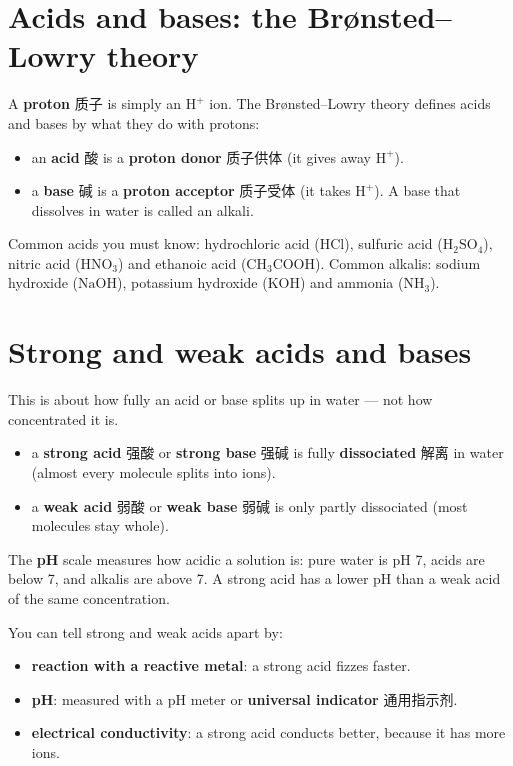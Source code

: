 \documentclass[11pt]{article}
\begin{document}
\section*{Acids and bases: the Brønsted–Lowry theory}

A \textbf{proton} 质子 is simply an $\text{H}^+$ ion. The Brønsted–Lowry theory defines acids and bases by what they do with protons:

\begin{itemize}
\item an \textbf{acid} 酸 is a \textbf{proton donor} 质子供体 (it gives away $\text{H}^+$).

\item a \textbf{base} 碱 is a \textbf{proton acceptor} 质子受体 (it takes $\text{H}^+$). A base that dissolves in water is called an alkali.

\end{itemize}

Common acids you must know: hydrochloric acid ($\text{HCl}$), sulfuric acid ($\text{H}_2\text{SO}_4$), nitric acid ($\text{HNO}_3$) and ethanoic acid ($\text{CH}_3\text{COOH}$). Common alkalis: sodium hydroxide ($\text{NaOH}$), potassium hydroxide ($\text{KOH}$) and ammonia ($\text{NH}_3$).

\section*{Strong and weak acids and bases}

This is about how fully an acid or base splits up in water — not how concentrated it is.

\begin{itemize}
\item a \textbf{strong acid} 强酸 or \textbf{strong base} 强碱 is fully \textbf{dissociated} 解离 in water (almost every molecule splits into ions).

\item a \textbf{weak acid} 弱酸 or \textbf{weak base} 弱碱 is only partly dissociated (most molecules stay whole).

\end{itemize}

The \textbf{pH} scale measures how acidic a solution is: pure water is pH 7, acids are below 7, and alkalis are above 7. A strong acid has a lower pH than a weak acid of the same concentration.

You can tell strong and weak acids apart by:

\begin{itemize}
\item \textbf{reaction with a reactive metal}: a strong acid fizzes faster.

\item \textbf{pH}: measured with a pH meter or \textbf{universal indicator} 通用指示剂.

\item \textbf{electrical conductivity}: a strong acid conducts better, because it has more ions.

\end{itemize}
\end{document}
